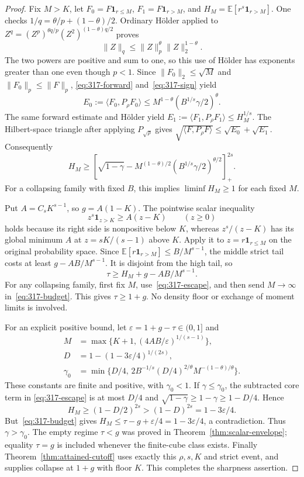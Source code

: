 \documentclass[11pt]{article}
\begin{document}
\begin{proof}
Fix $M>K$, let $F_0=F\mathbf1_{r\le M}$,
$F_1=F\mathbf1_{r>M}$, and $H_M=\mathbb E[r^s\mathbf1_{r>M}]$.
One checks $1/q=\theta/p+(1-\theta)/2$. Ordinary H\"older applied to
$Z^q=(Z^p)^{\theta q/p}(Z^2)^{(1-\theta)q/2}$ proves
\[
 \|Z\|_q\le\|Z\|_p^\theta\|Z\|_2^{1-\theta}.
\]
The two powers are positive and sum to one, so this use of H\"older has
exponents greater than one even though $p<1$.
Since $\|F_0\|_2\le\sqrt M$ and $\|F_0\|_p\le\|F\|_p$,
\eqref{eq:317-forward} and~\eqref{eq:317-sign} yield
\[
 E_0:=\langle F_0,P_\rho F_0\rangle
       \le M^{1-\theta}(B^{1/s}\gamma/2)^\theta.
\]
The same forward estimate and H\"older yield
$E_1:=\langle F_1,P_\rho F_1\rangle\le H_M^{1/s}$.
The Hilbert-space triangle after applying $P_{\sqrt\rho}$ gives
$\sqrt{\langle F,P_\rho F\rangle}\le\sqrt{E_0}+\sqrt{E_1}$.
Consequently
\begin{equation}\label{eq:317-escape}
 H_M\ge\left[\sqrt{1-\gamma}
 -M^{(1-\theta)/2}(B^{1/s}\gamma/2)^{\theta/2}\right]_+^{2s}.
\end{equation}
For a collapsing family with fixed $B$, this implies
$\liminf H_M\ge1$ for each fixed $M$.

Put $A=C_sK^{s-1}$, so $g=A(1-K)$. The pointwise scalar inequality
\[
 z^s\mathbf1_{z>K}\ge A(z-K)\qquad(z\ge0)
\]
holds because its right side is nonpositive below $K$, whereas
$z^s/(z-K)$ has its global minimum $A$ at $z=sK/(s-1)$ above $K$.
Apply it to $z=r\mathbf1_{r\le M}$ on the original probability space.
Since $\mathbb E[r\mathbf1_{r>M}]\le B/M^{s-1}$, the middle strict
tail costs at least $g-AB/M^{s-1}$. It is disjoint from the high tail,
so
\begin{equation}\label{eq:317-budget}
 \tau\ge H_M+g-AB/M^{s-1}.
\end{equation}
For any collapsing family, first fix $M$, use~\eqref{eq:317-escape},
and then send $M\to\infty$ in~\eqref{eq:317-budget}. This gives
$\tau\ge1+g$. No density floor or exchange of moment limits is involved.

For an explicit positive bound, let $\varepsilon=1+g-\tau\in(0,1]$ and
\begin{align*}
 M&=\max\{K+1,(4AB/\varepsilon)^{1/(s-1)}\},\\
 D&=1-(1-3\varepsilon/4)^{1/(2s)},\\
 \gamma_0&=\min\{D/4,\,
 2B^{-1/s}(D/4)^{2/\theta}M^{-(1-\theta)/\theta}\}.
\end{align*}
These constants are finite and positive, with $\gamma_0<1$.
If $\gamma\le\gamma_0$, the subtracted core term in
\eqref{eq:317-escape} is at most $D/4$ and
$\sqrt{1-\gamma}\ge1-\gamma\ge1-D/4$. Hence
\[
 H_M\ge(1-D/2)^{2s}>(1-D)^{2s}=1-3\varepsilon/4.
\]
But~\eqref{eq:317-budget} gives
$H_M\le\tau-g+\varepsilon/4=1-3\varepsilon/4$, a contradiction.
Thus $\gamma>\gamma_0$. The empty regime $\tau<g$ was proved in
Theorem~\ref{thm:scalar-envelope}; equality $\tau=g$ is included whenever
the finite-cube class exists. Finally Theorem~\ref{thm:attained-cutoff}
uses exactly this $\rho,s,K$ and strict event, and supplies collapse at
$1+g$ with floor $K$. This completes the sharpness assertion.
\end{proof}
\end{document}
